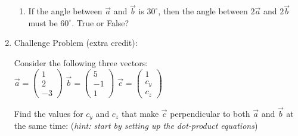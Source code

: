 \documentclass[12pt, twoside]{article}
\begin{document}
\begin{enumerate}[itemsep=6cm]
\begin{enumerate}[itemsep=1cm]
        \item If the angle between $\vec{a}$ and $\vec{b}$ is $30^\circ$, then the angle between $2\vec{a}$ and $2\vec{b}$ must be $60^\circ$. True or False?
    \end{enumerate}

    \newpage

    \item Challenge Problem (extra credit):
    
    \begin{center}
        \vspace{.5cm}
        Consider the following three vectors: \\
        \vspace{1cm}
        $\vec{a} = \begin{pmatrix} 1 \\ 2 \\ -3 \end{pmatrix}$ \hspace{1.5cm}
        $\vec{b} = \begin{pmatrix} 5 \\ -1 \\ 1 \end{pmatrix}$ \hspace{1.5cm}
        $\vec{c} = \begin{pmatrix} 1 \\ c_y \\ c_z \end{pmatrix}$
    \end{center}

    \vspace{.5cm}
    
    Find the values for $c_y$ and $c_z$ that make $\vec{c}$ perpendicular to both $\vec{a}$ and $\vec{b}$ at the same time: (\emph{hint: start by setting up the dot-product equations})
    
\end{enumerate}
\end{document}

